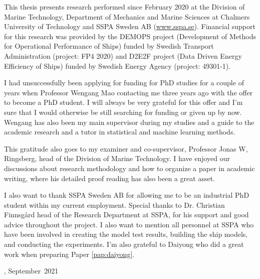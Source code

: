 This thesis presents research performed since February 2020 at the Division of Marine Technology, Department of Mechanics and Marine Sciences at Chalmers University of Technology and SSPA Sweden AB (\href{www.sspa.se}{www.sspa.se}). Financial support for this research was provided by the DEMOPS project (Development of Methods for Operational Performance of Ships) funded by Swedish Transport Administration (project: FP4 2020) and D2E2F project (Data Driven Energy Efficiency of Ships) funded by Swedish Energy Agency (project: 49301-1).

I had unsuccessfully been applying for funding for PhD studies for a couple of years when Professor Wengang Mao contacting me three years ago with the offer to become a PhD student. I will always be very grateful for this offer and I'm sure that I would otherwise be still searching for funding or given up by now. Wengang has also been my main supervisor during my studies and a guide to the academic research and a tutor in statistical and machine learning methods.  

This gratitude also goes to my examiner and co-supervisor, Professor Jonas W, Ringsberg,
head of the Division of Marine Technology. I have enjoyed our discussions about research methodology and how to organize a paper in academic writing, where his detailed proof reading has also been a great asset.

I also want to thank SSPA Sweden AB for allowing me to be an industrial PhD student within my current employment. Special thanks to Dr. Christian Finnsgård head of the Research Department at SSPA, for his support and good advice throughout the project. I also want to mention all personnel at SSPA who have been involved in creating the model test results, building the ship models, and conducting the experiments.
I'm also grateful to Daiyong who did a great work when preparing Paper \ref{pap:daiyong}.

\vskip 2pc

\noindent \thesisauthor

\noindent \thesiscity, September\  2021  %
